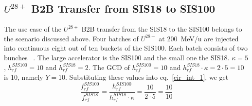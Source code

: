 \subsection{$U^{28+}$ B2B Transfer from SIS18 to SIS100}
\label{sec:cir_no_int}
The use case of the $U^{28+}$ B2B transfer from the SIS18 to the SIS100 belongs to the scenario discussed above. Four batches of $U^{28+}$ at \SI{200}{MeV/\atomicmassunit} are injected into continuous eight out of ten buckets of the SIS100. Each batch consists of two bunches ~\cite{liebermann_fair_2013, liebermann_sis100_2013}. The large accelerator is the SIS100 and the small one the SIS18. $\kappa=5$, $h^{\mathit{SIS100}}_\mathit{rf}=10$ and $h^{\mathit{SIS18}}_\mathit{rf}=2$. %
The GCD of $h^{\mathit{SIS100}}_\mathit{rf}=10$ and $h^{\mathit{SIS18}}_\mathit{rf} \cdot \kappa=2\cdot 5=10$ is 10, namely $Y=10$. Substituting these values into eq.~\ref{cir_int_1}, we get
\begin{equation}
\frac{f_{\mathit{rf}}^{\mathit{SIS100}}}{f_{\mathit{rf}}^{\mathit{SIS18}}}= \frac {h^{\mathit{SIS100}}_\mathit{rf}}{h^{\mathit{SIS18}}_\mathit{rf} \cdot \kappa}= \frac{10}{2 \cdot 5}=\frac{10}{10}
\end{equation}
